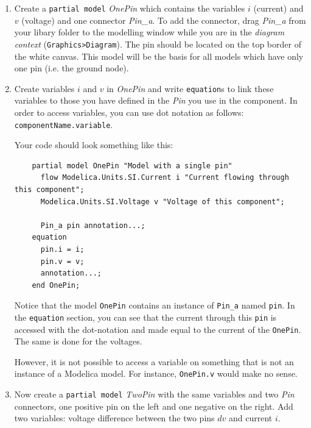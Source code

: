 \documentclass[10pt,a4paper]{article}
\begin{document}
\begin{enumerate}
	Make two different graphical illustrations for the pins. To do so, select the \textit{icon context} from the toolbar (\texttt{Graphics>Icon}). For example, you can draw a square in the available canvas and choose a different color for each of the pins. A good convention is to use the same shape for pins of the same flow type. 
	
	\item Create a \texttt{partial model} \textit{OnePin} which contains the variables $i$ (current) and $v$ (voltage) and one connector \textit{Pin\_a}. To add the connector, drag \textit{Pin\_a} from your libary folder to the modelling window while you are in the \textit{diagram context} (\texttt{Graphics>Diagram}). The pin should be located on the top border of the white canvas. This model will be the basis for all models which have only one pin (i.e. the ground node).
	
	\item Create variables $i$ and $v$ in \textit{OnePin} and write \texttt{equation}s to link these variables to those you have defined in the \textit{Pin} you use in the component. In order to access variables, you can use dot notation as follows: \texttt{componentName.variable}.
	
	Your code should look something like this:
	\begin{lstlisting}
	partial model OnePin "Model with a single pin"
	  flow Modelica.Units.SI.Current i "Current flowing through this component";
	  Modelica.Units.SI.Voltage v "Voltage of this component";
	
	  Pin_a pin annotation...;
	equation
	  pin.i = i;
	  pin.v = v;
	  annotation...;
	end OnePin;
	\end{lstlisting}

	Notice that the model \texttt{OnePin} contains an instance of \texttt{Pin\_a} named \texttt{pin}. In the \texttt{equation} section, you can see that the current through this \texttt{pin} is accessed with the dot-notation and made equal to the current of the \texttt{OnePin}. The same is done for the voltages.
	
	However, it is not possible to access a variable on something that is not an instance of a Modelica model. For instance, \texttt{OnePin.v} would make no sense.
	
	\item Now create a \texttt{partial model} \textit{TwoPin} with the same variables and two \textit{Pin} connectors, one positive pin on the left and one negative on the right. Add two variables: voltage difference between the two pins $dv$ and current $i$. 
	

\end{enumerate}
\end{document}
